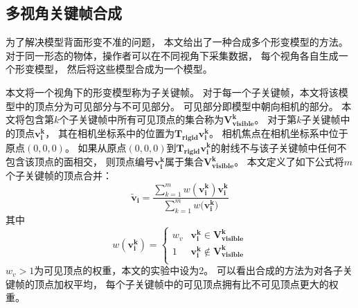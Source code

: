 \subsection{多视角关键帧合成}
为了解决模型背面形变不准的问题，
本文给出了一种合成多个形变模型的方法。
对于同一形态的物体，操作者可以在不同视角下采集数据，
每个视角各自生成一个形变模型，
然后将这些模型合成为一个模型。

本文将一个视角下的形变模型称为子关键帧。
对于每一个子关键帧，本文将该模型中的顶点分为可见部分与不可见部分。
可见部分即模型中朝向相机的部分。
本文将包含第$k$个子关键帧中所有可见顶点的集合称为$\bm{V_{visible}^k}$。
对于第$k$子关键帧中的顶点$\bm{v_i^k}$，
其在相机坐标系中的位置为$\bm{T_{rigid}}\bm{v_i^k}$。
相机焦点在相机坐标系中位于原点$(0,0,0)$。
如果从原点$(0,0,0)$到$\bm{T_{rigid}}\bm{v_i^k}$的射线不与该子关键帧中任何不包含该顶点的面相交，
则顶点编号$\bm{v_i^k}$属于集合$\bm{V_{visible}^k}$。
本文定义了如下公式将$m$个子关键帧的顶点合并：
\begin{equation}
    \widetilde{\bm{v}}_{\bm{i}} =
        \frac
            {\sum_{k=1}^{m} w(\bm{v_i^k})\bm{v_i^k}}
            {\sum_{k=1}^{m}w(\bm{v_i^k)}}
\end{equation}
其中
\begin{equation}
    w(\bm{v_i^k})=
    \begin{cases}
        w_v
        &\bm{v_i^k} \in \bm{V_{visible}^k}\\
        1
        &\bm{v_i^k} \notin \bm{V_{visible}^k}\\
    \end{cases}
\end{equation}
$w_v>1$为可见顶点的权重，本文的实验中设为2。
可以看出合成的方法为对各子关键帧的顶点加权平均，
每个子关键帧中的可见顶点拥有比不可见顶点更大的权重。
       
